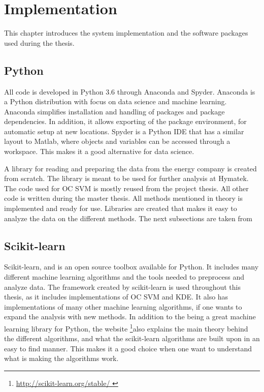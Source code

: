 \chapter{Implementation}\label{cha:implementation}
This chapter introduces the system implementation and the software packages used during the thesis.

\section{Python}
    All code is developed in Python 3.6 through Anaconda and Spyder. Anaconda is a Python distribution with focus on data science and machine learning. Anaconda simplifies installation and handling of packages and package dependencies. In addition, it allows exporting of the package environment, for automatic setup at new locations. Spyder is a Python IDE that has a similar layout to Matlab, where objects and variables can be accessed through a workspace. This makes it a good alternative for data science. 
    
    A library for reading and preparing the data from the energy company is created from scratch. The library is meant to be used for further analysis at Hymatek. The code used for OC SVM is mostly reused from the project thesis. All other code is written during the master thesis. All methods mentioned in theory is implemented and ready for use. Libraries are created that makes it easy to analyze the data on the different methods. The next subsections are taken from \cite{Aasnes2017} 
    
    
\section{Scikit-learn}
Scikit-learn, \cite{scikit-learn} and \cite{scikit-web} is an open source toolbox available for Python. It includes many different machine learning algorithms and the tools needed to preprocess and analyze data. The framework created by scikit-learn is used throughout this thesis, as it includes implementations of OC SVM and KDE. It also has implementations of many other machine learning algorithms, if one wants to expand the analysis with new methods. In addition to the being a great machine learning library for Python, the website \footnote{\url{http://scikit-learn.org/stable/ }}also explains the main theory behind the different algorithms, and what the scikit-learn algorithms are built upon in an easy to find manner. This makes it a good choice when one want to understand what is making the algorithms work.        

